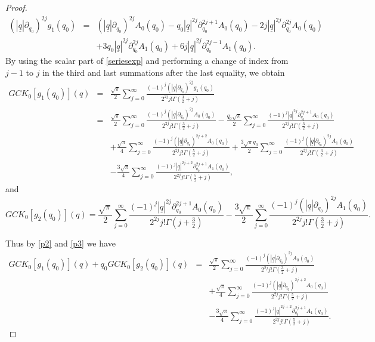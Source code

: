 \documentclass[reqno,11pt]{amsart}
\numberwithin{equation}{section}
\theoremstyle{definition}
\begin{document}
\begin{proof}
\begin{eqnarray}
\nonumber
(|\underline{q}| \partial_{q_0})^{2 j} g_1(q_0)&=& (|\underline{q}| \partial_{q_0})^{2 j}A_0(q_0)-q_0 | \underline{q}|^{2 j} \partial_{q_0}^{2 j +1} A_0(q_0)-2 j | \underline{q}|^{2 j} \partial_{q_0}^{2 j} A_0(q_0)\\
\label{rev1}
&&+3 q_0| \underline{q}|^{2 j} \partial_{q_0}^{2 j} A_1(q_0)+6 j | \underline{q}|^{2 j} \partial_{q_0}^{2 j -1}A_1(q_0) .
\end{eqnarray}
By using the scalar part of \eqref{seriesexp} and performing a change of index from $j-1$ to $j$ in the third and last summations after the last equality, we obtain
\begin{eqnarray}
	\nonumber
GCK_0[g_1(q_0)](q)&=& \frac{\sqrt{\pi}}{2} \sum_{j=0}^\infty \frac{(-1)^j (|\underline{q}| \partial_{q_0})^{2j}g_1(q_0)}{2^{2j}j! \Gamma \left(\frac{3}{2}+j\right)}\\
\nonumber
&=& \frac{\sqrt{\pi}}{2} \sum_{j=0}^\infty \frac{(-1)^j (|\underline{q}| \partial_{q_0})^{2j}A_0(q_0)}{2^{2j}j! \Gamma \left(\frac{3}{2}+j\right)}-\frac{q_0\sqrt{\pi}}{2} \sum_{j=0}^\infty \frac{(-1)^j |\underline{q}|^{2j} \partial_{q_0}^{2j+1}A_0(q_0)}{2^{2j}j! \Gamma \left(\frac{3}{2}+j\right)}\\
\nonumber
&&+ \frac{\sqrt{\pi}}{4} \sum_{j=0}^\infty \frac{(-1)^j (|\underline{q}| \partial_{q_0})^{2j+2} A_0(q_0)}{2^{2j}j! \Gamma \left(\frac{5}{2}+j\right)}+\frac{3 \sqrt{\pi}q_0}{2}\sum_{j=0}^\infty \frac{(-1)^j (|\underline{q}| \partial_{q_0})^{2j}A_1(q_0)}{2^{2j}j! \Gamma \left(\frac{3}{2}+j\right)}\\
\label{p2}
&&-\frac{3 \sqrt{\pi}}{4} \sum_{j=0}^\infty \frac{(-1)^j | \underline{q}|^{2j+2} \partial_{q_0}^{2j+1}A_1(q_0)}{2^{2j} j! \Gamma \left( \frac{5}{2}+j\right)},
\end{eqnarray}
and
\begin{equation}
\label{p3}
GCK_0[g_2(q_0)](q)= \frac{\sqrt{\pi}}{2} \sum_{j=0}^\infty \frac{(-1)^j | \underline{q}|^{2j} \partial_{q_0}^{2j+1}A_0(q_0)}{2^{2j}j! \Gamma \left(j+\frac{3}{2}\right)}- \frac{3 \sqrt{\pi}}{2} \sum_{j=0}^\infty \frac{(-1)^j (|\underline{q}| \partial_{q_0})^{2j}A_1(q_0)}{2^{2j}j! \Gamma \left(\frac{3}{2}+j\right)}.
\end{equation}

Thus by \eqref{p2} and \eqref{p3} we have
\begin{eqnarray}
\nonumber
GCK_0[g_1(q_0)](q)+q_0GCK_0[g_2(q_0)](q)&=&\frac{\sqrt{\pi}}{2} \sum_{j=0}^\infty \frac{(-1)^j (|\underline{q}| \partial_{q_0})^{2j}A_0(q_0)}{2^{2j}j! \Gamma \left(\frac{3}{2}+j\right)}\\
\nonumber
&&+ \frac{\sqrt{\pi}}{4} \sum_{j=0}^\infty \frac{(-1)^j (|\underline{q}| \partial_{q_0})^{2j+2} A_0(q_0)}{2^{2j}j! \Gamma \left(\frac{5}{2}+j\right)}\\
\label{scal}
	&&-\frac{3 \sqrt{\pi}}{4} \sum_{j=0}^\infty \frac{(-1)^j | \underline{q}|^{2j+2} \partial_{q_0}^{2j+1}A_1(q_0)}{2^{2j} j! \Gamma \left( \frac{5}{2}+j\right)}.
\end{eqnarray}



\end{proof}
\end{document}
